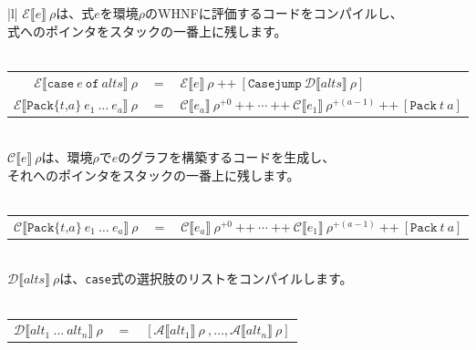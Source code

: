 \documentclass{jbook}
\begin{document}
\begin{tabular} {|l|} \hline
	$\mathcal{E} \llbracket e \rrbracket ~ \rho$は、式$e$を環境$\rho$のWHNFに評価するコードをコンパイルし、 \\
	式へのポインタをスタックの一番上に残します。                                                            \\
	\\
	\begin{tabular}{r c l}
		$\mathcal{E} \llbracket \texttt{case} ~ e ~ \texttt{of} ~ alts \rrbracket ~ \rho$                          & $=$ & $\mathcal{E} \llbracket e \rrbracket ~ \rho ~ \texttt{++} ~ \left[\texttt{Casejump} ~ \mathcal{D} \llbracket alts \rrbracket ~ \rho \right]$                                                         \\
		$\mathcal{E} \llbracket \texttt{Pack\{} t \texttt{,} a \texttt{\}} ~ e_1 ~ \ldots ~ e_a \rrbracket ~ \rho$ & $=$ & $\mathcal{C} \llbracket e_a \rrbracket ~ \rho^{+0} ~ \texttt{++} ~ \cdots ~ \texttt{++} ~ \mathcal{C} \llbracket e_1 \rrbracket ~ \rho^{+(a-1)} ~ \texttt{++} ~ \left[\texttt{Pack} ~ t ~ a \right]$ \\
	\end{tabular}
	\\ \hline
	$\mathcal{C} \llbracket e \rrbracket ~ \rho$は、環境$\rho$で$e$のグラフを構築するコードを生成し、       \\
	それへのポインタをスタックの一番上に残します。                                                          \\
	\\
	\begin{tabular}{r c l}
		$\mathcal{C} \llbracket \texttt{Pack\{} t \texttt{,} a \texttt{\}} ~ e_1 ~ \ldots ~ e_a \rrbracket ~ \rho$ & $=$ & $\mathcal{C} \llbracket e_a \rrbracket ~ \rho^{+0} ~ \texttt{++} ~ \cdots ~ \texttt{++} ~ \mathcal{C} \llbracket e_1 \rrbracket ~ \rho^{+(a-1)} ~ \texttt{++} ~ \left[\texttt{Pack} ~ t ~ a \right]$ \\
	\end{tabular}
	\\ \hline
	$\mathcal{D} \llbracket alts \rrbracket ~ \rho$は、\texttt{case}式の選択肢のリストをコンパイルします。  \\
	\\
	\begin{tabular}{r c l}
		$\mathcal{D} \llbracket alt_1 ~ \ldots ~ alt_n \rrbracket ~ \rho$ & $=$ & $\left[\mathcal{A} \llbracket alt_1 \rrbracket ~ \rho ~ , \ldots , \mathcal{A} \llbracket alt_n \rrbracket ~ \rho \right]$ \\

\end{tabular}
\end{tabular}
\end{document}
